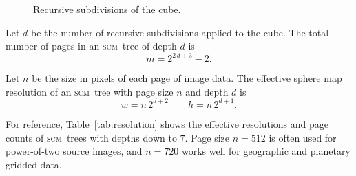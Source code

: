 \documentclass[oneside,11pt]{memoir}
\newcommand{\scm}     {\textsc{scm}}
\begin{document}
\begin{Spacing}{1.1}
\begin{figure}
  \centering
  \hfil
  \caption{Recursive subdivisions of the cube.}
  \label{fig:subdivision}
\end{figure}

Let $d$ be the number of recursive subdivisions applied to the cube. The total number of pages in an \scm\ tree of depth $d$ is
\[m=2^{2\,d+3}-2.\]

Let $n$ be the size in pixels of each page of image data. The effective sphere map resolution of an \scm\ tree with page size $n$ and depth $d$ is
\[w=n\,2^{d+2}\qquad h=n\,2^{d+1}.\]

For reference, Table~\ref{tab:resolution} shows the effective resolutions and page counts of \scm\ trees with depths down to $7$. Page size $n=512$ is often used for power-of-two source images, and $n=720$ works well for geographic and planetary gridded data.


\end{Spacing}
\end{document}
